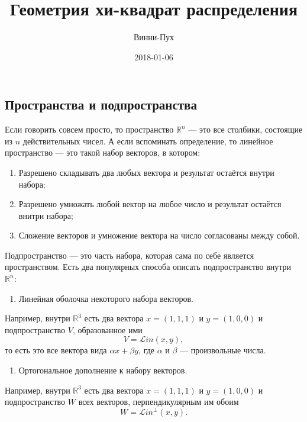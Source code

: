 \documentclass[11pt,russian,]{article}
\title{Геометрия хи-квадрат распределения}
\author{Винни-Пух}
\date{2018-01-06}
\providecommand{\tightlist}{%
  \setlength{\itemsep}{0pt}\setlength{\parskip}{0pt}}
\newcommand{\RR}{\mathbb{R}}
\renewcommand{\Rn}{\RR^n}
\newcommand{\1}{\mathbbm{1}}
\newcommand{\Lin}{\mathcal{L}in}
\newcommand{\Linp}{\Lin^{\perp}}
\begin{document}
\maketitle

{
\setcounter{tocdepth}{2}
\tableofcontents
}
\subsection{Пространства и подпространства}\label{--}

Если говорить совсем просто, то пространство \(\Rn\) --- это все
столбики, состоящие из \(n\) действительных чисел. А если вспоминать
определение, то линейное пространство --- это такой набор векторов, в
котором:

\begin{enumerate}
\def\labelenumi{\arabic{enumi}.}
\tightlist
\item
  Разрешено складывать два любых вектора и результат остаётся внутри
  набора;
\item
  Разрешено умножать любой вектор на любое число и результат остаётся
  внитри набора;
\item
  Сложение векторов и умножение вектора на число согласованы между
  собой.
\end{enumerate}

Подпространство --- это часть набора, которая сама по себе является
пространством. Есть два популярных способа описать подпространство
внутри \(\Rn\):

\begin{enumerate}
\def\labelenumi{\arabic{enumi}.}
\tightlist
\item
  Линейная оболочка некоторого набора векторов.
\end{enumerate}

Например, внутри \(\RR^{3}\) есть два вектора \(x = (1, 1, 1)\) и
\(y = (1, 0, 0)\) и подпространство \(V\), образованное ими \[
V = \Lin (x, y),
\] то есть это все вектора вида \(\alpha x + \beta y\), где \(\alpha\) и
\(\beta\) --- произвольные числа.

\begin{enumerate}
\def\labelenumi{\arabic{enumi}.}
\setcounter{enumi}{1}
\tightlist
\item
  Ортогональное дополнение к набору векторов.
\end{enumerate}

Например, внутри \(\RR^{3}\) есть два вектора \(x = (1, 1, 1)\) и
\(y = (1, 0, 0)\) и подпространство \(W\) всех векторов,
перпендикулярным им обоим \[
W = \Linp (x, y).
\]
\end{document}
